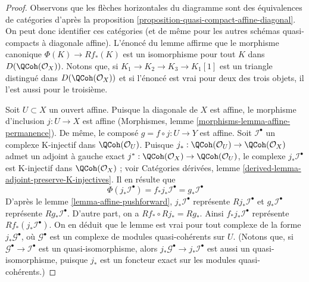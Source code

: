 \begin{proof}
Observons que les flèches horizontales du diagramme sont
des équivalences de catégories d'après la
proposition \ref{proposition-quasi-compact-affine-diagonal}.
On peut donc identifier ces catégories (et de même pour
les autres schémas quasi-compacts à diagonale affine).
L'énoncé du lemme affirme que le morphisme canonique
$\Phi(K) \to Rf_*(K)$ est un isomorphisme pour tout $K$ dans
$D(\QCoh(\mathcal{O}_X))$. Notons que, si $K_1 \to K_2 \to K_3 \to K_1[1]$
est un triangle distingué dans $D(\QCoh(\mathcal{O}_X))$ et
si l'énoncé est vrai pour deux des trois objets, il l'est
aussi pour le troisième.

\medskip\noindent
Soit $U \subset X$ un ouvert affine. Puisque la diagonale de $X$ est affine,
le morphisme d'inclusion $j : U \to X$
est affine (Morphismes, lemme \ref{morphisms-lemma-affine-permanence}).
De même, le composé $g = f \circ j : U \to Y$ est affine.
Soit $\mathcal{I}^\bullet$ un complexe K-injectif dans $\QCoh(\mathcal{O}_U)$.
Puisque $j_* : \QCoh(\mathcal{O}_U) \to \QCoh(\mathcal{O}_X)$
admet un adjoint à gauche exact
$j^* : \QCoh(\mathcal{O}_X) \to \QCoh(\mathcal{O}_U)$,
le complexe $j_*\mathcal{I}^\bullet$ est K-injectif
dans $\QCoh(\mathcal{O}_X)$ ; voir
Catégories dérivées, lemme \ref{derived-lemma-adjoint-preserve-K-injectives}.
Il en résulte que
$$
\Phi(j_*\mathcal{I}^\bullet) =
f_*j_*\mathcal{I}^\bullet =
g_*\mathcal{I}^\bullet
$$
D'après le lemme \ref{lemma-affine-pushforward},
$j_*\mathcal{I}^\bullet$ représente $Rj_*\mathcal{I}^\bullet$ et
$g_*\mathcal{I}^\bullet$ représente $Rg_*\mathcal{I}^\bullet$.
D'autre part, on a $Rf_* \circ Rj_* = Rg_*$.
Ainsi $f_*j_*\mathcal{I}^\bullet$ représente $Rf_*(j_*\mathcal{I}^\bullet)$.
On en déduit que le lemme est vrai pour tout complexe
de la forme $j_*\mathcal{G}^\bullet$, où $\mathcal{G}^\bullet$
est un complexe de modules quasi-cohérents sur $U$. (Notons que, si
$\mathcal{G}^\bullet \to \mathcal{I}^\bullet$ est un quasi-isomorphisme,
alors $j_*\mathcal{G}^\bullet \to j_*\mathcal{I}^\bullet$ est aussi un
quasi-isomorphisme, puisque $j_*$ est un foncteur exact
sur les modules quasi-cohérents.)


\end{proof}
